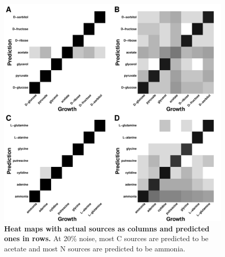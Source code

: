 \documentclass[12pt]{article}
\begin{document}

\clearpage
\begin{figure}[p]
\centerline{\includegraphics[width=6in]{Figures/heatmap.pdf}}
\caption{\label{fig:heat_map}\textbf{Heat maps with actual sources as columns and predicted ones in rows.}  At 20\% noise, most C sources are predicted to be acetate and most N sources are predicted to be ammonia.}
\end{figure}
\end{document}
